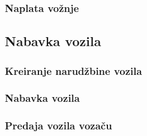 \subsubsection{\bfseries Naplata vo\v znje}
\subsection{\bfseries Nabavka vozila}

\subsubsection{\bfseries Kreiranje narudžbine vozila}

\subsubsection{\bfseries Nabavka vozila}

\subsubsection{\bfseries Predaja vozila vozaču}

